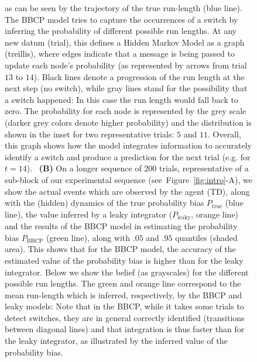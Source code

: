 \documentclass[12pt,english]{article}%
\newcommand{\seeFig}[1]{Figure~\ref{fig:#1}}
\newcommand{\CP}[1]{\textbf{\textcolor{green}{[CP: #1]}}}
\begin{document}
\begin{figure}
{as can be seen by the trajectory of the true run-length (blue line).
The BBCP model tries to capture the occurrences of a switch
by inferring the probability of different possible run lengths.
At any new datum (trial), this defines a Hidden Markov Model
as a graph (treillis), where %
edges indicate that a message is being passed
to update each node's probability (as represented by arrows from trial $13$ to $14$).
Black lines denote a progression of the run length at the next step (no switch),
while gray lines stand for the possibility that a switch happened:
In this case the run length would fall back to zero.
The probability for each node is represented by the grey scale (darker grey colors denote higher probability)
and the distribution is shown in the inset for two representative trials: $5$ and $11$.
Overall, this graph shows how the model integrates information to accurately identify a switch
and produce a prediction for the next trial (e.g. for $t=14$).
~\textbf{(B)} On a longer sequence of $200$ trials,
representative of a sub-block of our experimental sequence (see~\seeFig{intro}-A), %
we show %
the actual events which are observed by the agent (TD),
along with the (hidden) dynamics of the true probability bias $P_{\text{true}}$ (blue line),
the value inferred by a leaky integrator ($P_{\text{leaky}}$, orange line)
and the results of the BBCP model
in estimating the probability bias $P_{\text{BBCP}}$ (green line),
along with $.05$ and $.95$ quantiles (shaded area).
This shows that for the BBCP model,
the accuracy of the estimated value of the probability bias
is higher than for the leaky integrator.
Below we show the belief (as grayscales) for the different possible run lengths.
The green and orange line correspond to the mean run-length which is inferred,
respectively, by the BBCP and leaky models:
Note that in the BBCP, while it takes some trials to detect switches,
they are in general correctly identified (transitions between diagonal lines) and
that integration is thus faster than for the leaky integrator, 
as illustrated by the inferred value of the probability bias.
}
\label{fig:Bayesianchangepoint}
\end{figure}
\end{document}
